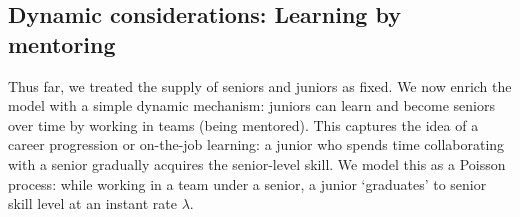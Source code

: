 \documentclass[12pt]{article}
\begin{document}
{%

\subsection{Dynamic considerations: Learning by mentoring}\label{sec:learning}

Thus far, we treated the supply of seniors and juniors as fixed. We now enrich the model with a simple dynamic mechanism: juniors can learn and become seniors over time by working in teams (being mentored). This captures the idea of a career progression or on-the-job learning: a junior who spends time collaborating with a senior gradually acquires the senior-level skill. We model this as a Poisson process: while working in a team under a senior, a junior `graduates' to senior skill level at an instant rate \(\lambda\). %

}
\end{document}
